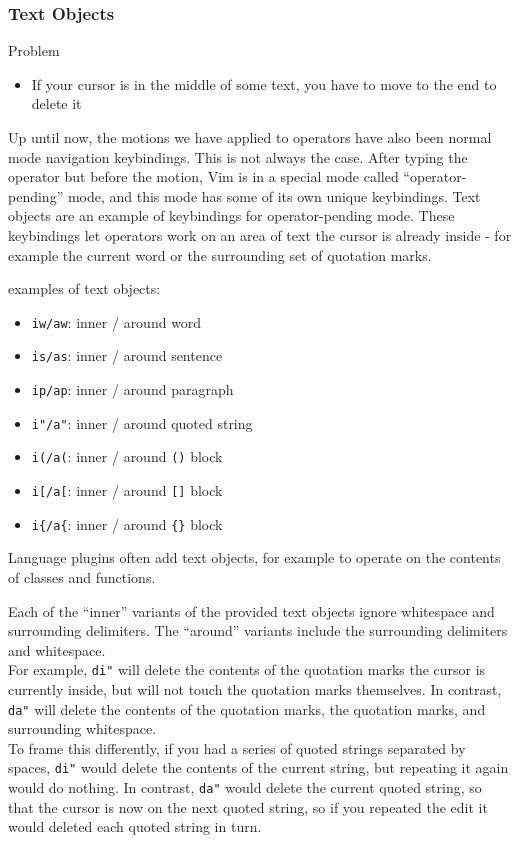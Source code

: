 \documentclass{beamer}
\begin{document}
\begin{frame}[fragile]
    \frametitle{Text Objects}
    \begin{block}{Problem}
	\begin{itemize}
	    \item If your cursor is in the middle of some text, you have to move to the end to delete it
	\end{itemize}
    \end{block}
    Up until now, the motions we have applied to operators have also been normal mode navigation keybindings. This is not always the case. After typing the operator but before the motion, Vim is in a special mode called \enquote{operator-pending} mode, and this mode has some of its own unique keybindings. Text objects are an example of keybindings for operator-pending mode. These keybindings let operators work on an area of text the cursor is already inside - for example the current word or the surrounding set of quotation marks.
\end{frame}

\begin{frame}[fragile]
    examples of text objects:
    \begin{itemize}
	\item \verb+iw/aw+: inner / around word
	\item \verb+is/as+: inner / around sentence
	\item \verb+ip/ap+: inner / around paragraph
	\item \verb+i"/a"+: inner / around quoted string
	\item \verb+i(/a(+: inner / around \verb+()+ block
	\item \verb+i[/a[+: inner / around \verb+[]+ block
	\item \verb+i{/a{+: inner / around \verb+{}+ block
    \end{itemize}
    Language plugins often add text objects, for example to operate on the contents of classes and functions.
\end{frame}

\begin{frame}[fragile]
    Each of the \enquote{inner} variants of the provided text objects ignore whitespace and surrounding delimiters. The \enquote{around} variants include the surrounding delimiters and whitespace. \\
    \vspace{0.5cm}
    For example, \verb+di"+ will delete the contents of the quotation marks the cursor is currently inside, but will not touch the quotation marks themselves. In contrast, \verb+da"+ will delete the contents of the quotation marks, the quotation marks, and surrounding whitespace. \\
    \vspace{0.5cm}
    To frame this differently, if you had a series of quoted strings separated by spaces, \verb+di"+ would delete the contents of the current string, but repeating it again would do nothing. In contrast, \verb+da"+ would delete the current quoted string, so that the cursor is now on the next quoted string, so if you repeated the edit it would deleted each quoted string in turn.
\end{frame}
\end{document}

